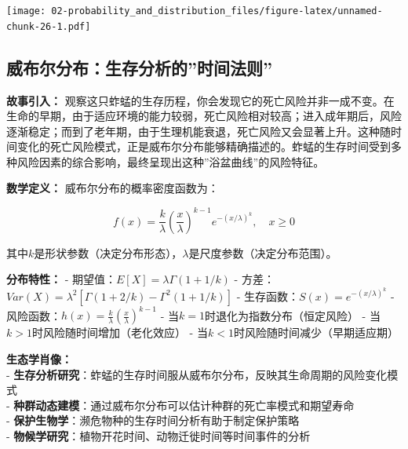\documentclass[
  twoside]{book}
\begin{document}
\texttt{[image: 02-probability\_and\_distribution\_files/figure-latex/unnamed-chunk-26-1.pdf]}

\hypertarget{ux5a01ux5e03ux5c14ux5206ux5e03ux751fux5b58ux5206ux6790ux7684ux65f6ux95f4ux6cd5ux5219}{%
\subsection{威布尔分布：生存分析的''时间法则''}\label{ux5a01ux5e03ux5c14ux5206ux5e03ux751fux5b58ux5206ux6790ux7684ux65f6ux95f4ux6cd5ux5219}}

\textbf{故事引入：} 观察这只蚱蜢的生存历程，你会发现它的死亡风险并非一成不变。在生命的早期，由于适应环境的能力较弱，死亡风险相对较高；进入成年期后，风险逐渐稳定；而到了老年期，由于生理机能衰退，死亡风险又会显著上升。这种随时间变化的死亡风险模式，正是威布尔分布能够精确描述的。蚱蜢的生存时间受到多种风险因素的综合影响，最终呈现出这种''浴盆曲线''的风险特征。

\textbf{数学定义：} 威布尔分布的概率密度函数为：

\[f(x) = \frac{k}{\lambda} \left(\frac{x}{\lambda}\right)^{k-1} e^{-(x/\lambda)^k}, \quad x \geq 0\]

其中\(k\)是形状参数（决定分布形态），\(\lambda\)是尺度参数（决定分布范围）。

\textbf{分布特性：}
- 期望值：\(E[X] = \lambda \Gamma(1 + 1/k)\)
- 方差：\(Var(X) = \lambda^2 [\Gamma(1 + 2/k) - \Gamma^2(1 + 1/k)]\)
- 生存函数：\(S(x) = e^{-(x/\lambda)^k}\)
- 风险函数：\(h(x) = \frac{k}{\lambda} \left(\frac{x}{\lambda}\right)^{k-1}\)
- 当\(k=1\)时退化为指数分布（恒定风险）
- 当\(k>1\)时风险随时间增加（老化效应）
- 当\(k<1\)时风险随时间减少（早期适应期）

\textbf{生态学肖像：}\\
- \textbf{生存分析研究}：蚱蜢的生存时间服从威布尔分布，反映其生命周期的风险变化模式\\
- \textbf{种群动态建模}：通过威布尔分布可以估计种群的死亡率模式和期望寿命\\
- \textbf{保护生物学}：濒危物种的生存时间分析有助于制定保护策略\\
- \textbf{物候学研究}：植物开花时间、动物迁徙时间等时间事件的分析
\end{document}
